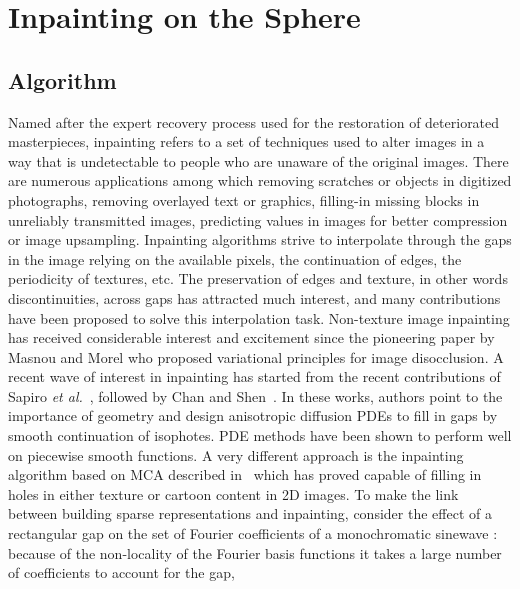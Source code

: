 \section{Inpainting on the Sphere}
\label{sect_inpaint}
\subsection{Algorithm}
Named after the expert recovery process used for the restoration of deteriorated masterpieces, inpainting refers to a set 
of techniques used to alter images in a way that is undetectable to people who are unaware of the original images. There are 
numerous applications among which removing scratches or objects in digitized photographs, removing overlayed text or graphics, 
filling-in missing blocks in unreliably transmitted images, predicting values in images for better compression or image upsampling. 
Inpainting algorithms strive to interpolate through the gaps in the image relying on the available pixels, the continuation of edges, 
the periodicity of textures, etc. The preservation of edges and texture, in other words discontinuities, across gaps has attracted 
much interest, and many contributions have been proposed to solve this interpolation task. Non-texture image inpainting has received 
considerable interest and excitement since the pioneering paper by Masnou and Morel \cite{Masnou98, Masnou02} who proposed variational 
principles for image disocclusion. A recent wave of interest in inpainting has started from the recent contributions of Sapiro 
\emph{et al.}~\cite{text:sapiro1,text:sapiro2,text:sapiro3}, followed by Chan and Shen~\cite{text:chan1}. In these works, authors point 
to the importance of geometry and design anisotropic diffusion PDEs to fill in gaps by smooth continuation of isophotes. 
PDE methods have been shown to perform well on piecewise smooth functions.
% 
A very different approach is the inpainting algorithm based on MCA described in~\cite{starck:elad05} which has proved capable 
of filling in holes in either texture or cartoon content in 2D images. To make the link between building sparse representations 
and inpainting, consider the effect of a rectangular gap on the set of Fourier coefficients of a monochromatic sinewave : 
because of the non-locality of the Fourier basis functions it takes a large number of coefficients to account for the gap, 
